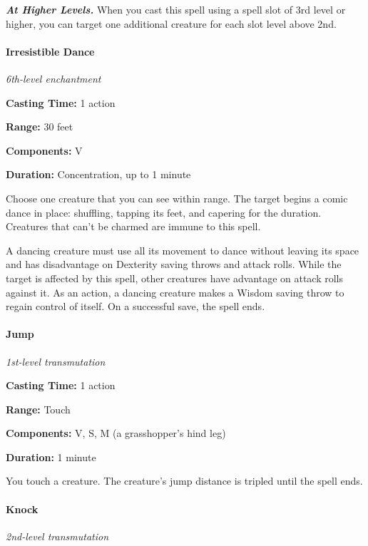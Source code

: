 \documentclass[
]{article}
\begin{document}
\emph{\textbf{At Higher Levels.}} When you cast this spell using a spell
slot of 3rd level or higher, you can target one additional creature for
each slot level above 2nd.

\hypertarget{irresistible-dance}{%
\paragraph{Irresistible Dance}\label{irresistible-dance}}

\emph{6th-level enchantment}

\textbf{Casting Time:} 1 action

\textbf{Range:} 30 feet

\textbf{Components:} V

\textbf{Duration:} Concentration, up to 1 minute

Choose one creature that you can see within range. The target begins a
comic dance in place: shuffling, tapping its feet, and capering for the
duration. Creatures that can't be charmed are immune to this spell.

A dancing creature must use all its movement to dance without leaving
its space and has disadvantage on Dexterity saving throws and attack
rolls. While the target is affected by this spell, other creatures have
advantage on attack rolls against it. As an action, a dancing creature
makes a Wisdom saving throw to regain control of itself. On a successful
save, the spell ends.

\hypertarget{jump}{%
\paragraph{Jump}\label{jump}}

\emph{1st-level transmutation}

\textbf{Casting Time:} 1 action

\textbf{Range:} Touch

\textbf{Components:} V, S, M (a grasshopper's hind leg)

\textbf{Duration:} 1 minute

You touch a creature. The creature's jump distance is tripled until the
spell ends.

\hypertarget{knock}{%
\paragraph{Knock}\label{knock}}

\emph{2nd-level transmutation}
\end{document}

